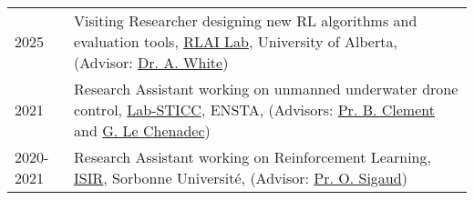 
\begin{longtable}[l]{@{}p{} p{}}
    2025 & Visiting Researcher designing new RL algorithms and evaluation tools, \href{http://rlai.ualberta.ca/}{RLAI Lab}, University of Alberta, (Advisor: \href{https://cifar.ca/fr/biographie/adam-white/#topskipToContent}{Dr. A. White}) \\

    2021 & Research Assistant working on unmanned underwater drone control, \href{https://www.ensta-bretagne.fr/fr/recherche-en-technologies-de-linformation-et-de-la-communication-lab-sticc}{Lab-STICC}, ENSTA, (Advisors: \href{https://www.ensta-bretagne.fr/clement/}{Pr. B. Clement} and \href{https://www.ensta-bretagne.fr/fr/annuaire/gilles.le.chenadec}{G. Le Chenadec}) \\

    2020-2021 & Research Assistant working on Reinforcement Learning, \href{https://www.isir.upmc.fr/}{ISIR}, Sorbonne Universit\'e, (Advisor: \href{https://www.isir.upmc.fr/personnel/sigaud/}{Pr. O. Sigaud}) \\

\end{longtable}
